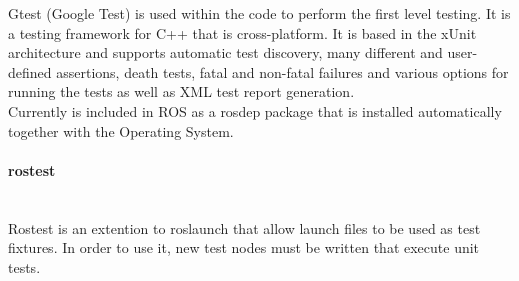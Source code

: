 		\label{gtest}
		Gtest (Google Test) is used within the code to perform the first level testing. It is a testing framework for C++ that is cross-platform. It is based in the xUnit architecture and supports automatic test discovery, many different and user-defined assertions, death tests, fatal and non-fatal failures and various options for running the tests as well as XML test report generation. 
		\\

		Currently is included in ROS as a rosdep package that is installed automatically together with the Operating System. 


		\paragraph{rostest}\mbox{} \\

		\label{rostest}
		Rostest is an extention to roslaunch that allow launch files to be used as test fixtures. 
		In order to use it, new test nodes must be written that execute unit tests. 
